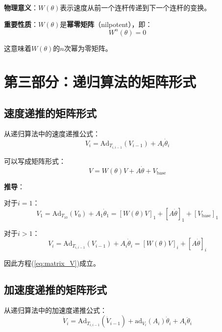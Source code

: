 \documentclass[12pt,a4paper]{article}
\begin{document}
\textbf{物理意义}：$W(\theta)$表示速度从前一个连杆传递到下一个连杆的变换。

\textbf{重要性质}：$W(\theta)$是\textbf{幂零矩阵}（nilpotent），即：
\begin{equation}
W^n(\theta) = 0
\label{eq:W_nilpotent}
\end{equation}

这意味着$W(\theta)$的$n$次幂为零矩阵。

\section{第三部分：递归算法的矩阵形式}

\subsection{速度递推的矩阵形式}

从递归算法中的速度递推公式：
\begin{equation}
V_i = \text{Ad}_{T_{i,i-1}}(V_{i-1}) + A_i \dot{\theta}_i
\end{equation}

可以写成矩阵形式：
\begin{equation}
V = W(\theta)V + A\dot{\theta} + V_{\text{base}}
\label{eq:matrix_V}
\end{equation}

\textbf{推导}：

对于$i = 1$：
\begin{equation}
V_1 = \text{Ad}_{T_{10}}(V_0) + A_1 \dot{\theta}_1 = [W(\theta)V]_1 + [A\dot{\theta}]_1 + [V_{\text{base}}]_1
\end{equation}

对于$i > 1$：
\begin{equation}
V_i = \text{Ad}_{T_{i,i-1}}(V_{i-1}) + A_i \dot{\theta}_i = [W(\theta)V]_i + [A\dot{\theta}]_i
\end{equation}

因此方程(\ref{eq:matrix_V})成立。

\subsection{加速度递推的矩阵形式}

从递归算法中的加速度递推公式：
\begin{equation}
\dot{V}_i = \text{Ad}_{T_{i,i-1}}(\dot{V}_{i-1}) + \text{ad}_{V_i}(A_i)\dot{\theta}_i + A_i \ddot{\theta}_i
\end{equation}
\end{document}
